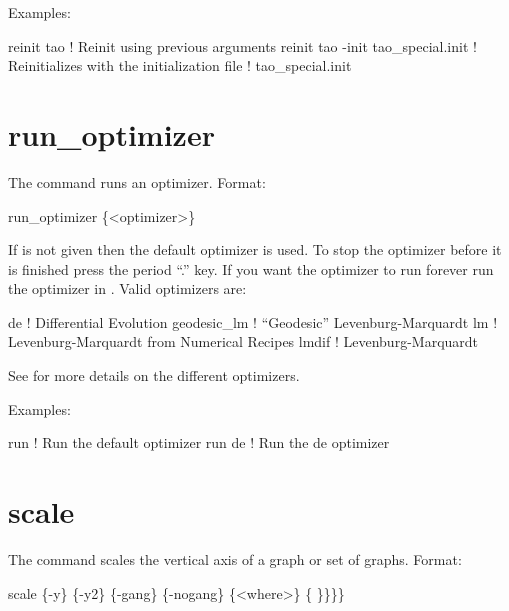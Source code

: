 Examples:
\begin{example}
  reinit tao                         ! Reinit using previous arguments
  reinit tao -init tao_special.init  ! Reinitializes \tao with the initialization file 
                                     !   tao_special.init
\end{example}


\section{run_optimizer}
\label{s:run}

The  command runs an optimizer. Format:
\begin{example}
  run_optimizer \{<optimizer>\}
\end{example}

\vskip 0.2in 

If  is not given then the default optimizer is
used. To stop the optimizer before it is finished press the period
``.''  key. If you want the optimizer to run forever run the optimizer
in . Valid optimizers are:
\begin{example}
  de            ! Differential Evolution
  geodesic_lm   ! ``Geodesic'' Levenburg-Marquardt 
  lm            ! Levenburg-Marquardt from Numerical Recipes 
  lmdif         ! Levenburg-Marquardt 
\end{example}
See  for more details on the different
optimizers.

Examples:
\begin{example}
  run         ! Run the default optimizer
  run de      ! Run the de optimizer
\end{example}

\section{scale}
\label{s:scale}

The  command scales the vertical axis of a graph or set of graphs.
Format:
\begin{example}
  scale \{-y\} \{-y2\} \{-gang\} \{-nogang\} \{<where>\} \{<value1> \}<value2>\}\}\}
\end{example}

